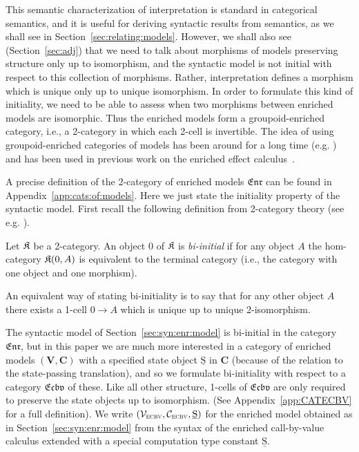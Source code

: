 \documentclass{LMCS}
\newcommand{\VCat}{\fixedcatfont{V}} \newcommand{\CCat}{\fixedcatfont{C}} \newcommand{\DCat}{\fixedcatfont{D}}
\newcommand{\fixedcatfont}{\mathbf}
\newcommand{\SA}{A}
\newcommand{\states}{{\underline{\mathrm{S}}}}
\newcommand{\SynEnrichedModel}{(\VSynE,\CSynE, \states)}
\newcommand{\VSynE}{\mathcal{V}_{\textsc{ecbv}}}
\newcommand{\CSynE}{\mathcal{C}_{\textsc{ecbv}}}
\newcommand{\ENR}{\TwoCatFont{Enr}}
\newcommand{\CATECBV}{\TwoCatFont{Ecbv}}
\newcommand{\TwoCatFont}[1]{\mathfrak{#1}}
\newcommand{\initobj}{0} \newcommand{\initmorph}{?}
\begin{document}
This semantic characterization 
of interpretation is standard in categorical semantics, and it
is useful for deriving syntactic results from semantics, as we shall see
in Section~\ref{sec:relating:models}. 
However, we shall also see (Section~\ref{sec:adj})
that we need to talk about morphisms of models preserving structure only 
up to isomorphism, and the syntactic model is not initial with respect 
to this collection of morphisms. Rather, interpretation defines a morphism
which is unique only up to unique isomorphism. In order to formulate
this kind of initiality, we need to be able to assess when 
two morphisms between enriched models are isomorphic.
Thus the enriched models
form a 
groupoid-enriched category,
i.e., a 2-category in which each 2-cell is invertible.
The idea of using groupoid-enriched 
categories of models has been around for a long time 
(e.g. \cite[\S 8]{dk-alggraph})
and has been used in previous work on the enriched effect 
calculus~\cite{Mogelberg:CSL:09,Mogelberg:fossacs:10}. 

A precise definition of the 2-category of enriched models $\ENR$ can be found in 
Appendix~\ref{app:cats:of:models}. Here we just state the initiality property of the syntactic model.
First recall the following definition from 2-category theory 
(see e.g. \cite[\S6]{k-twocatlimits}).

\begin{defi} \label{def:biinitial}
Let $\mathfrak{K}$ be a 2-category. An object $\initobj$ of $\mathfrak{K}$ is \emph{bi-initial} if
for any object $\SA$ the hom-category $\ccat(\initobj, \SA)$ is equivalent to 
the terminal category (i.e., the category with one object and one morphism).
\end{defi}
An equivalent way of stating bi-initiality is to say that 
for any other object $\SA$ 
there exists a 1-cell $\initobj \to \SA$
which is unique up to unique 2-isomorphism.


The syntactic model of Section~\ref{sec:syn:enr:model} is bi-initial in the category $\ENR$, but in this paper
we are much more interested in a category of enriched models  $(\VCat, \CCat)$ 
with a specified state object $\states$ in $\CCat$ (because of the relation to the state-passing
translation), and so we formulate bi-initiality with respect to a category 
$\CATECBV$ of these. Like all other structure, 1-cells of $\CATECBV$ are 
only required to preserve the state objects up to isomorphism. (See Appendix~\ref{app:CATECBV} 
for a full definition). We write $\SynEnrichedModel$ for the enriched model 
obtained as in Section~\ref{sec:syn:enr:model} from the syntax of the enriched call-by-value calculus
extended with a special computation type constant $\states$.
\end{document}
